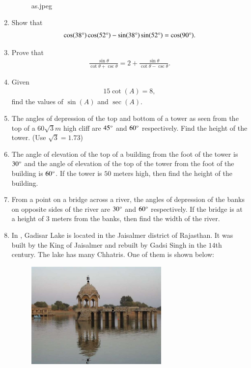 \begin{enumerate}
\begin{figure}[H]
        \caption{as.jpeg}
        \label{fig:as.jpeg}
    \end{figure}
    \hfill{}\item Show that 
    \begin{align}
        \cos(38\degree) \cos(52\degree) - \sin(38\degree)\sin(52\degree) = \cos(90\degree).
    \end{align}
    \hfill{}\item Prove that 
    \begin{align}
        \frac{\sin\theta}{\cot\theta+\csc\theta} = 2+\frac{\sin\theta}{\cot\theta-\csc\theta}.
    \end{align}
    \hfill{}\item Given 
    \begin{align}
        15 \cot (A) = 8,
    \end{align}
    find the values of $\sin (A)$ and $\sec (A)$.
    \hfill{}\item The angles of depression of the top and bottom of a tower as seen from the top of a $60\sqrt{3}m$ high cliff are $45\degree$ and $60\degree$ respectively. Find the height of the tower. (Use $\sqrt{3}=1.73$)
    \hfill{}\item The angle of elevation of the top of a building from the foot of the tower is $30\degree$ and the angle of elevation of the top of the tower from the foot of the building is $60\degree$. If the tower is $50$ meters high, then find the height of the building.
    \hfill{}\item From a point on a bridge across a river, the angles of depression of the banks on opposite sides of the river are $30\degree$ and $60\degree$ respectively. If the bridge is at a height of $3$ meters from the banks, then find the width of the river. 
    \hfill{}\item In , Gadisar Lake is located in the Jaisalmer district of Rajasthan. It was built by the King of Jaisalmer and rebuilt by Gadsi Singh in the $14$th century. The lake has many Chhatris. One of them is shown below:
    \begin{figure}[H]
        \centering
    	 \includegraphics[width=70mm]{cbse/figs/ak.jpeg}

\end{figure}
\end{enumerate}
